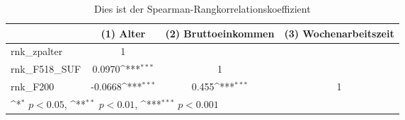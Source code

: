 \begin{table}[htbp]\centering
\def\sym#1{\ifmmode^{#1}\else\(^{#1}\)\fi}
\caption{Dies ist der Spearman-Rangkorrelationskoeffizient}
\begin{tabular}{l*{3}{c}}
\toprule
                              &(1) Alter         &(2) Bruttoeinkommen         &(3) Wochenarbeitszeit         \\
\midrule
rnk\_zpalter                   &        1         &                  &                  \\
rnk\_F518\_SUF                  &   0.0970\sym{***}&        1         &                  \\
rnk\_F200                      &  -0.0668\sym{***}&    0.455\sym{***}&        1         \\
\bottomrule
\multicolumn{4}{l}{\footnotesize \sym{*} \(p<0.05\), \sym{**} \(p<0.01\), \sym{***} \(p<0.001\)}\\
\end{tabular}
\end{table}
